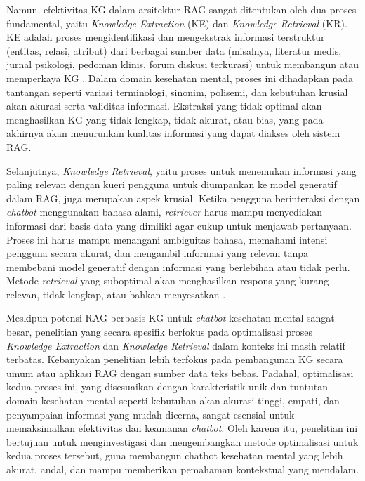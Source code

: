 Namun, efektivitas KG dalam arsitektur RAG sangat ditentukan oleh dua proses fundamental, yaitu \textit{Knowledge Extraction} (KE) dan \textit{Knowledge Retrieval} (KR).
KE adalah proses mengidentifikasi dan mengekstrak informasi terstruktur (entitas, relasi, atribut) dari berbagai sumber data (misalnya, literatur medis, jurnal psikologi, pedoman klinis, forum diskusi terkurasi) untuk membangun atau memperkaya KG \cite{Choi2025KnowledgeGraphConstruction}.
Dalam domain kesehatan mental, proses ini dihadapkan pada tantangan seperti variasi terminologi, sinonim, polisemi, dan kebutuhan krusial akan akurasi serta validitas informasi.
Ekstraksi yang tidak optimal akan menghasilkan KG yang tidak lengkap, tidak akurat, atau bias, yang pada akhirnya akan menurunkan kualitas informasi yang dapat diakses oleh sistem RAG.

Selanjutnya, \textit{Knowledge Retrieval}, yaitu proses untuk menemukan informasi yang paling relevan dengan kueri pengguna untuk diumpankan ke model generatif dalam RAG, juga merupakan aspek krusial.
Ketika pengguna berinteraksi dengan \textit{chatbot} menggunakan bahasa alami, \textit{retriever} harus mampu menyediakan informasi dari basis data yang dimiliki agar cukup untuk menjawab pertanyaan.
Proses ini harus mampu menangani ambiguitas bahasa, memahami intensi pengguna secara akurat, dan mengambil informasi yang relevan tanpa membebani model generatif dengan informasi yang berlebihan atau tidak perlu.
Metode \textit{retrieval} yang suboptimal akan menghasilkan respons yang kurang relevan, tidak lengkap, atau bahkan menyesatkan \cite{Edge2025LocalGlobalGraphRAG}.

Meskipun potensi RAG berbasis KG untuk \textit{chatbot} kesehatan mental sangat besar, penelitian yang secara spesifik berfokus pada optimalisasi proses \textit{Knowledge Extraction} dan \textit{Knowledge Retrieval} dalam konteks ini masih relatif terbatas.
Kebanyakan penelitian lebih terfokus pada pembangunan KG secara umum atau aplikasi RAG dengan sumber data teks bebas.
Padahal, optimalisasi kedua proses ini, yang disesuaikan dengan karakteristik unik dan tuntutan domain kesehatan mental seperti kebutuhan akan akurasi tinggi, empati, dan penyampaian informasi yang mudah dicerna, sangat esensial untuk memaksimalkan efektivitas dan keamanan \textit{chatbot}.
Oleh karena itu, penelitian ini bertujuan untuk menginvestigasi dan mengembangkan metode optimalisasi untuk kedua proses tersebut, guna membangun chatbot kesehatan mental yang lebih akurat, andal, dan mampu memberikan pemahaman kontekstual yang mendalam.

